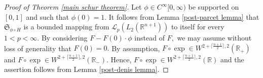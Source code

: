 \documentclass{amsart}
\begin{document}
\begin{proof}[Proof of Theorem \ref{main schur theorem}] Let $\phi\in C^{\infty}[0,\infty)$ be supported on $[0,1]$ and such that $\phi(0)=1.$ It follows from Lemma \ref{post-parcet lemma} that $\mathfrak{S}_{\phi\circ H}$ is a bounded mapping from $\mathcal{L}_p(L_2(\mathbb{R}^{n+1}))$ to itself for every $1<p<\infty.$ By considering $F-F(0)\cdot\phi$ instead of $F,$ we may assume without loss of generality that $F(0)=0.$ By assumption, $F\circ\exp\in W^{2+\lceil\frac{n+1}{2}\rceil,2}(\mathbb{R}_+)$ and $F\circ\exp\in W^{2+\lceil\frac{n+1}{2}\rceil,2}(\mathbb{R}_-).$ Hence, $F\circ\exp\in W^{2+\lceil\frac{n+1}{2}\rceil,2}(\mathbb{R})$ and the assertion follows from Lemma \ref{post-denis lemma}.
\end{proof}
\end{document}
